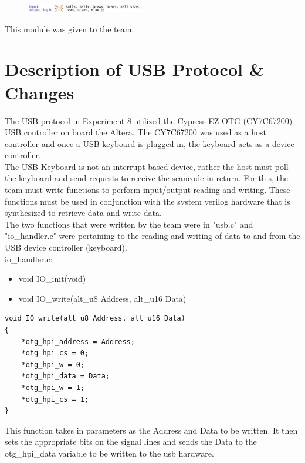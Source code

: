 \documentclass[journal, twocolumn, final,11pt,letterpaper]{IEEEtran}
\begin{document}
\begin{figure}[h]
	\centering
	\includegraphics[width=0.45\textwidth]{colorio.jpg}
	\label{fig:colorio}
	\end{figure}

This module was given to the team. \\



\section{Description of USB Protocol \& Changes}
The USB protocol in Experiment 8 utilized the Cypress EZ-OTG (CY7C67200) USB controller on board the Altera. The CY7C67200 was used as a host controller and once a USB keyboard is plugged in, the keyboard acts as a device controller.\\

The USB Keyboard is not an interrupt-based device, rather the host must poll the keyboard and send requests to receive the scancode in return. For this, the team must write functions to perform input/output reading and writing. These functions must be used in conjunction with the system verilog hardware that is synthesized to retrieve data and write data. \\

The two functions that were written by the team were in "usb.c" and "io\_handler.c" were pertaining to the reading and writing of data to and from the USB device controller (keyboard).\\

io\_handler.c:
\begin{itemize}
	\item 	void IO\_init(void)
	\item 	void IO\_write(alt\_u8 Address, alt\_u16 Data)
\end{itemize}


\begin{lstlisting}
void IO_write(alt_u8 Address, alt_u16 Data)
{
	*otg_hpi_address = Address;
	*otg_hpi_cs = 0;
	*otg_hpi_w = 0;
	*otg_hpi_data = Data;
	*otg_hpi_w = 1;
	*otg_hpi_cs = 1;
}
\end{lstlisting}
This function takes in parameters as the Address and Data to be written. It then sets the appropriate bits on the signal lines and sends the Data to the otg\_hpi\_data variable to be written to the usb hardware.\\ 
\end{document}

